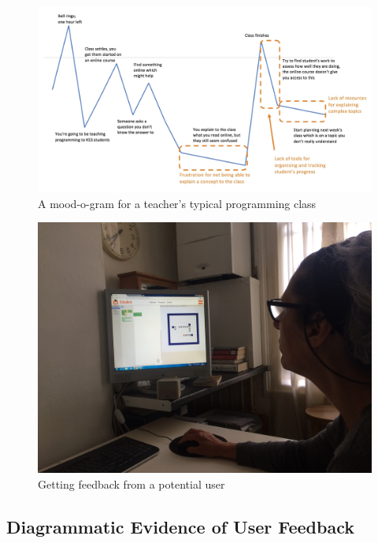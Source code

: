 \documentclass[a4wide, 11pt]{article}
\begin{document}
\begin{figure}[h]
  \includegraphics[scale=0.3]{mood-o-gram.jpeg}
  \centering
  \caption{A mood-o-gram for a teacher's typical programming class}
\end{figure}

\begin{figure}[t]
  \includegraphics[scale=0.14]{user_feedback_session.JPG}
  \centering
  \caption{Getting feedback from a potential user}
\end{figure}

\FloatBarrier
\subsection{Diagrammatic Evidence of User Feedback}
\end{document}
